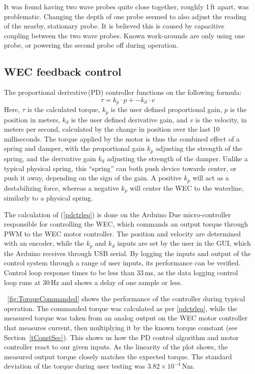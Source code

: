 \documentclass[hardware,article,submit,pdftex,moreauthors]{Definitions/mdpi}
\begin{document}
It was found having two wave probes quite close together, roughly 1\,ft apart, was problematic.
Changing the depth of one probe seemed to also adjust the reading of the nearby, stationary probe.
It is believed this is caused by capacitive coupling between the two wave probes.
Known work-arounds are only using one probe, or powering the second probe off during operation.

\subsection{WEC feedback control}
The proportional derivative\,(PD) controller functions on the following formula:
%
\begin{equation}  \label{pdctrleq}
  \tau = k_p \cdot p + -k_d \cdot v
\end{equation}
%
Here, $\tau$ is the calculated torque, $k_p$ is the user defined proportional gain, $p$ is the position in meters, $k_d$ is the user defined derivative gain, and $v$ is the velocity, in meters per second, calculated by the change in position over the last 10 milliseconds. 
The torque applied by the motor is thus the combined effect of a spring and damper, with the proportional gain $k_p$ adjusting the strength of the spring, and the derivative gain $k_d$ adjusting the strength of the damper.
Unlike a typical physical spring, this ``spring'' can both push device towards center, or push it away, depending on the sign of the gain.
A positive $k_p$ will act as a destabilizing force, whereas a negative $k_p$ will center the WEC to the waterline, similarly to a physical spring.

The calculation of (\ref{pdctrleq}) is done on the Arduino Due micro-controller responsible for controlling the WEC, which commands an output torque through PWM to the WEC motor controller.
The position and velocity are determined with an encoder, while the $k_p$ and $k_d$ inputs are set by the user in the GUI, which the Arduino receives through USB serial.
By logging the inputs and output of the control system through a range of user inputs, its performance can be verified.
Control loop response times to be less than 33\,ms, as the data logging control loop runs at 30\,Hz and shows a delay of one sample or less.

\figurename~\ref{fig:TorqueCommanded} shows the performance of the controller during typical operation. 
The commanded torque was calculated as per \eqref{pdctrleq}, while the measured torque was taken from an analog output on the WEC motor controller that measures current, then multiplying it by the known torque constant (see Section~\ref{tConstSec}).
This shows us how the PD control algorithm and motor controller react to our given inputs.
As the linearity of the plot shows, the measured output torque closely matches the expected torque.
The standard deviation of the torque during user testing was $3.82 \times 10^{-4}$\,Nm.
\end{document}
